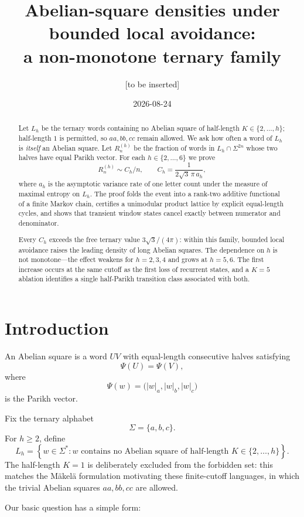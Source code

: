 \documentclass[12pt]{article}
\title{Abelian-square densities under bounded local avoidance:\\ a non-monotone ternary family}
\author{[to be inserted]}
\date{2026-08-24}
\theoremstyle{definition}
\begin{document}
\maketitle

\begin{abstract}
Let \(L_h\) be the ternary words containing no Abelian square of half-length \(K\in\{2,\ldots,h\}\); half-length \(1\) is permitted, so \(aa,bb,cc\) remain allowed. We ask how often a word of \(L_h\) is \emph{itself} an Abelian square. Let \(R_n^{(h)}\) be the fraction of words in \(L_h\cap\Sigma^{2n}\) whose two halves have equal Parikh vector. For each \(h\in\{2,\ldots,6\}\) we prove
\[
R_n^{(h)}\sim C_h/n,
\qquad
C_h=\frac{1}{2\sqrt3\,\pi\,a_h},
\]
where \(a_h\) is the asymptotic variance rate of one letter count under the measure of maximal entropy on \(L_h\). The proof folds the event into a rank-two additive functional of a finite Markov chain, certifies a unimodular product lattice by explicit equal-length cycles, and shows that transient window states cancel exactly between numerator and denominator.

Every \(C_h\) exceeds the free ternary value \(3\sqrt3/(4\pi)\): within this family, bounded local avoidance raises the leading density of long Abelian squares. The dependence on \(h\) is not monotone---the effect weakens for \(h=2,3,4\) and grows at \(h=5,6\). The first increase occurs at the same cutoff as the first loss of recurrent states, and a \(K=5\) ablation identifies a single half-Parikh transition class associated with both.
\end{abstract}

\section{Introduction}
\label{sec:intro}

An Abelian square is a word \(UV\) with equal-length consecutive halves satisfying
\[
\Psi(U)=\Psi(V),
\]
where
\[
\Psi(w)=\bigl(|w|_a,|w|_b,|w|_c\bigr)
\]
is the Parikh vector.

Fix the ternary alphabet
\[
\Sigma=\{a,b,c\}.
\]
For \(h\ge2\), define
\[
L_h
=
\left\{
w\in\Sigma^*:
w\text{ contains no Abelian square of half-length }K\in\{2,\ldots,h\}
\right\}.
\]
The half-length \(K=1\) is deliberately excluded from the forbidden set: this matches the M\"akel\"a formulation motivating these finite-cutoff languages, in which the trivial Abelian squares \(aa,bb,cc\) are allowed.

Our basic question has a simple form:
\end{document}

